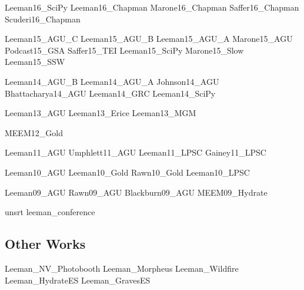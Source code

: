 \documentclass[letterpaper]{article}
\begin{document}
\begingroup
\renewcommand{\section}[2]{}

\nocite{conf}{Leeman16_SciPy}
\nocite{conf}{Leeman16_Chapman}
\nocite{conf}{Marone16_Chapman}
\nocite{conf}{Saffer16_Chapman}
\nocite{conf}{Scuderi16_Chapman}

\nocite{conf}{Leeman15_AGU_C}
\nocite{conf}{Leeman15_AGU_B}
\nocite{conf}{Leeman15_AGU_A}
\nocite{conf}{Marone15_AGU}
\nocite{conf}{Podcast15_GSA}
\nocite{conf}{Saffer15_TEI}
\nocite{conf}{Leeman15_SciPy}
\nocite{conf}{Marone15_Slow}
\nocite{conf}{Leeman15_SSW}

\nocite{conf}{Leeman14_AGU_B}
\nocite{conf}{Leeman14_AGU_A}
\nocite{conf}{Johnson14_AGU}
\nocite{conf}{Bhattacharya14_AGU}
\nocite{conf}{Leeman14_GRC}
\nocite{conf}{Leeman14_SciPy}

\nocite{conf}{Leeman13_AGU}
\nocite{conf}{Leeman13_Erice}
\nocite{conf}{Leeman13_MGM}

\nocite{conf}{MEEM12_Gold}

\nocite{conf}{Leeman11_AGU}
\nocite{conf}{Umphlett11_AGU}
\nocite{conf}{Leeman11_LPSC}
\nocite{conf}{Gainey11_LPSC}

\nocite{conf}{Leeman10_AGU}
\nocite{conf}{Leeman10_Gold}
\nocite{conf}{Rawn10_Gold}
\nocite{conf}{Leeman10_LPSC}

\nocite{conf}{Leeman09_AGU}
\nocite{conf}{Rawn09_AGU}
\nocite{conf}{Blackburn09_AGU}
\nocite{conf}{MEEM09_Hydrate}


{unsrt}
{leeman_conference}{}
\endgroup

\subsection*{Other Works}

\begingroup
\renewcommand{\section}[2]{}

\nocite{other}{Leeman_NV_Photobooth}
\nocite{other}{Leeman_Morpheus}
\nocite{other}{Leeman_Wildfire}
\nocite{other}{Leeman_HydrateES}
\nocite{other}{Leeman_GravesES}
\end{document}
